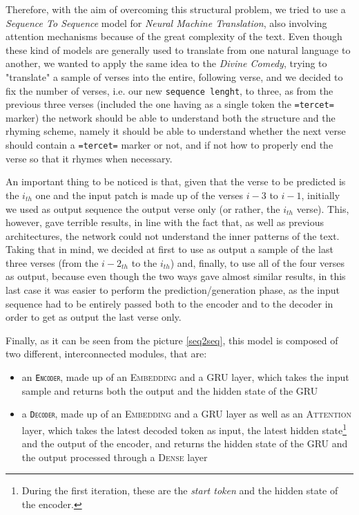 Therefore, with the aim of overcoming this structural problem, we tried to use a \textit{Sequence To Sequence} model for \textit{Neural Machine Translation}, also involving attention mechanisms because of the great complexity of the text.
Even though these kind of models are generally used to translate from one natural language to another, we wanted to apply the same idea to the \textit{Divine Comedy}, trying to "translate" a sample of verses into the entire, following verse, and we decided to fix the number of verses, i.e. our new \texttt{sequence lenght}, to three, as from the previous three verses (included the one having as a single token the \texttt{=tercet=} marker) the network should be able to understand both the structure and the rhyming scheme, namely it should be able to understand whether the next verse should contain a \texttt{=tercet=} marker or not, and if not how to properly end the verse so that it rhymes when necessary.

An important thing to be noticed is that, given that the verse to be predicted is the $i_{th}$ one and the input patch is made up of the verses $i-3$ to $i-1$, initially we used as output sequence the output verse only (or rather, the $i_{th}$ verse).
This, however, gave terrible results, in line with the fact that, as well as previous architectures, the network could not understand the inner patterns of the text.
Taking that in mind, we decided at first to use as output a sample of the last three verses (from the $i-2_{th}$ to the $i_{th}$) and, finally, to use all of the four verses as output, because even though the two ways gave almost similar results, in this last case it was easier to perform the prediction/generation phase, as the input sequence had to be entirely passed both to the encoder and to the decoder in order to get as output the last verse only.

Finally, as it can be seen from the picture \ref{seq2seq}, this model is composed of two different, interconnected modules, that are:
\begin{itemize}
    \item an \texttt{\textsc{Encoder}}, made up of an \textsc{Embedding} and a \textsc{GRU} layer, which takes the input sample and returns both the output and the hidden state of the \textsc{GRU}
    \item a \texttt{\textsc{Decoder}}, made up of an \textsc{Embedding} and a \textsc{GRU} layer as well as an \textsc{Attention} layer, which takes the latest decoded token as input, the latest hidden state\footnote{
        During the first iteration, these are the \textit{start token} and the hidden state of the encoder.
    } and the output of the encoder, and returns the hidden state of the \textsc{GRU} and the output processed through a \textsc{Dense} layer
\end{itemize}

